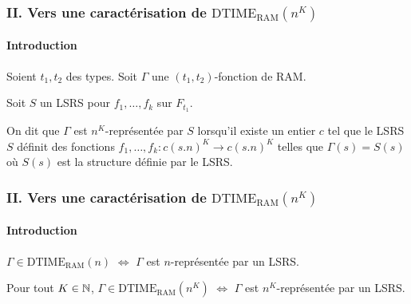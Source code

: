 \documentclass[10pt]{beamer}
\newcommand{\dtimeram}{\text{DTIME}_{\text{RAM}}\left( n^K \right)}
\begin{document}
	
	\begin{frame}
		\frametitle{II. Vers une caractérisation de $\dtimeram$}
		\framesubtitle{Introduction}
		
		\begin{definition}
			\label{def:representee_par_LSRS}
			Soient $t_1, t_2$ des types. Soit $\Gamma$ une $(t_1, t_2)$-fonction de RAM.
			
			Soit $S$ un LSRS pour $f_1, \dots, f_k$ sur $F_{t_1}$. 
			
			On dit que $\Gamma$ est $n^K$-représentée par $S$ lorsqu'il existe un entier $c$ tel que le LSRS $S$ définit des fonctions $f_1, \dots, f_k : c (s.n)^K \to c (s.n)^K$ telles que $\Gamma(s) = S(s)$ où $S(s)$ est la structure définie par le LSRS.
		\end{definition}
	\end{frame}
	
	\begin{frame}
		\frametitle{II. Vers une caractérisation de $\dtimeram$}
		\framesubtitle{Introduction}
		
		\begin{thm}
			$\Gamma \in \text{DTIME}_{\text{RAM}}\left( n \right)$ $\Leftrightarrow$ $\Gamma$ est $n$-représentée par un LSRS.
		\end{thm}
		
		\espace 
		
		
		\begin{thm}
			Pour tout $K \in \mathbb{N}$, $\Gamma \in \text{DTIME}_{\text{RAM}}\left( n^K \right)$ $\Leftrightarrow$ $\Gamma$ est $n^K$-représentée par un LSRS.
		\end{thm}
	\end{frame}
	
	
\end{document}
